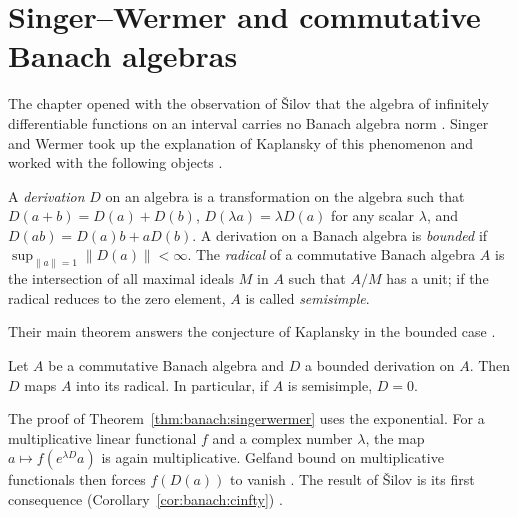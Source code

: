 \section{Singer--Wermer and commutative Banach algebras}\label{sec:banach-operator:singer-wermer}

The chapter opened with the observation of \v{S}ilov that the algebra of
infinitely differentiable functions on an interval carries no Banach
algebra norm \cite[p.~260]{SingerWermer1955}. Singer and Wermer took up
the explanation of Kaplansky of this phenomenon and worked with the following
objects \cite[p.~260]{SingerWermer1955}.

\begin{definition}\label{def:banach:derivation}
A \emph{derivation} $D$ on an algebra is a transformation on the algebra
such that $D(a+b)=D(a)+D(b)$, $D(\lambda a)=\lambda D(a)$ for any scalar
$\lambda$, and $D(ab)=D(a)b+aD(b)$. A derivation on a Banach algebra is
\emph{bounded} if $\sup_{\|a\|=1}\|D(a)\|<\infty$. The \emph{radical} of a
commutative Banach algebra $A$ is the intersection of all maximal ideals
$M$ in $A$ such that $A/M$ has a unit; if the radical reduces to the zero
element, $A$ is called \emph{semisimple}.
\end{definition}

Their main theorem answers the conjecture of Kaplansky in the bounded case
\cite[p.~260]{SingerWermer1955}.

\begin{theorem}\label{thm:banach:singerwermer}
Let $A$ be a commutative Banach algebra and $D$ a bounded derivation on
$A$. Then $D$ maps $A$ into its radical. In particular, if $A$ is
semisimple, $D=0$.
\end{theorem}

The proof of Theorem~\ref{thm:banach:singerwermer} uses the exponential.
For a multiplicative linear functional $f$ and a complex number $\lambda$,
the map $a\mapsto f(e^{\lambda D}a)$ is again multiplicative. Gelfand
bound on multiplicative functionals then forces $f(D(a))$ to vanish
\cite[p.~260]{SingerWermer1955}. The result of \v{S}ilov is its first
consequence (Corollary~\ref{cor:banach:cinfty}) \cite[p.~260]{SingerWermer1955}.

